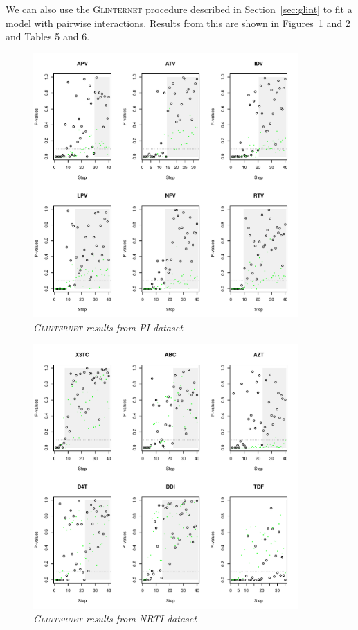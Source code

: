 \documentclass{imsart}
\begin{document}
We can also use the \textsc{Glinternet} procedure described in Section~\ref{sec:glint} to fit a model with pairwise interactions. Results from this are shown in Figures~\ref{fig:HIVPI:glint} and \ref{fig:HIVNRTI:glint} and Tables 5 and 6.

\begin{figure}
\begin{center}
\includegraphics[width=0.9\textwidth]{../figs/HIV_PI_glint.pdf}
\caption{\small \it \textsc{Glinternet} results from PI dataset}
\label{fig:HIVPI:glint}
\end{center}
\end{figure}

\begin{figure}
\begin{center}
\includegraphics[width=0.9\textwidth]{../figs/HIV_NRTI_glint.pdf}
\caption{\small \it \textsc{Glinternet} results from NRTI dataset}
\label{fig:HIVNRTI:glint}
\end{center}
\end{figure}
\end{document}
